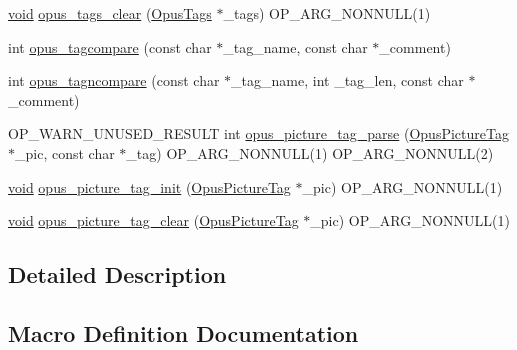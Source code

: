 \begin{DoxyCompactItemize}
\mbox{\hyperlink{_s_d_l__opengles2__gl2ext_8h_ae5d8fa23ad07c48bb609509eae494c95}{void}} \mbox{\hyperlink{group__header__info_ga16d4f85561a965d56e0c5177fa129c35}{opus\+\_\+tags\+\_\+clear}} (\mbox{\hyperlink{struct_opus_tags}{Opus\+Tags}} $\ast$\+\_\+tags) O\+P\+\_\+\+A\+R\+G\+\_\+\+N\+O\+N\+N\+U\+LL(1)
\item 
int \mbox{\hyperlink{group__header__info_gaad7582aee9be320d26b13f77e7b54106}{opus\+\_\+tagcompare}} (const char $\ast$\+\_\+tag\+\_\+name, const char $\ast$\+\_\+comment)
\item 
int \mbox{\hyperlink{group__header__info_gabf02fa65e49fde045ef787e42ef7b8c0}{opus\+\_\+tagncompare}} (const char $\ast$\+\_\+tag\+\_\+name, int \+\_\+tag\+\_\+len, const char $\ast$\+\_\+comment)
\item 
O\+P\+\_\+\+W\+A\+R\+N\+\_\+\+U\+N\+U\+S\+E\+D\+\_\+\+R\+E\+S\+U\+LT int \mbox{\hyperlink{group__header__info_ga6487af1d21fe87f4815567d85a27989a}{opus\+\_\+picture\+\_\+tag\+\_\+parse}} (\mbox{\hyperlink{struct_opus_picture_tag}{Opus\+Picture\+Tag}} $\ast$\+\_\+pic, const char $\ast$\+\_\+tag) O\+P\+\_\+\+A\+R\+G\+\_\+\+N\+O\+N\+N\+U\+LL(1) O\+P\+\_\+\+A\+R\+G\+\_\+\+N\+O\+N\+N\+U\+LL(2)
\item 
\mbox{\hyperlink{_s_d_l__opengles2__gl2ext_8h_ae5d8fa23ad07c48bb609509eae494c95}{void}} \mbox{\hyperlink{group__header__info_ga09b9724bb7a9abd1d78680bd7d420ec2}{opus\+\_\+picture\+\_\+tag\+\_\+init}} (\mbox{\hyperlink{struct_opus_picture_tag}{Opus\+Picture\+Tag}} $\ast$\+\_\+pic) O\+P\+\_\+\+A\+R\+G\+\_\+\+N\+O\+N\+N\+U\+LL(1)
\item 
\mbox{\hyperlink{_s_d_l__opengles2__gl2ext_8h_ae5d8fa23ad07c48bb609509eae494c95}{void}} \mbox{\hyperlink{group__header__info_ga26a732722fc74274d76b855020822852}{opus\+\_\+picture\+\_\+tag\+\_\+clear}} (\mbox{\hyperlink{struct_opus_picture_tag}{Opus\+Picture\+Tag}} $\ast$\+\_\+pic) O\+P\+\_\+\+A\+R\+G\+\_\+\+N\+O\+N\+N\+U\+LL(1)
\end{DoxyCompactItemize}


\subsection{Detailed Description}


\subsection{Macro Definition Documentation}
\mbox{\label{group__header__info_gaa7d5e8cb675cb2da840f258b761e7781}} 
